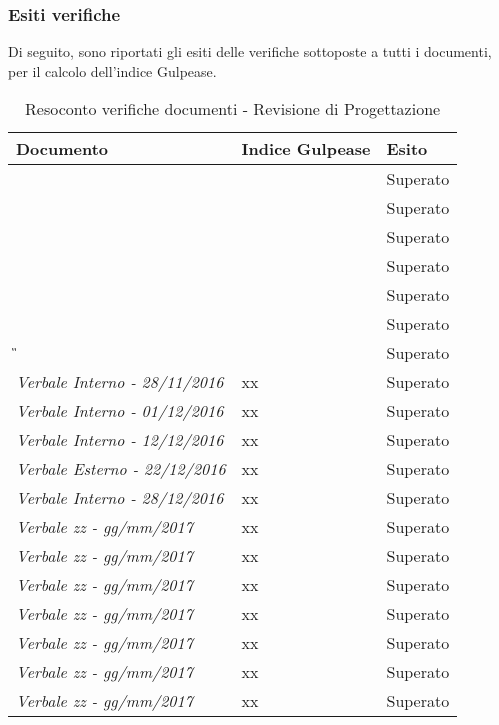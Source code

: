 	\subsubsection{Esiti verifiche}
	Di seguito, sono riportati gli esiti delle verifiche sottoposte a tutti i documenti, per il calcolo dell’indice Gulpease.


	\begin{table}[H]
		\begin{longtable}{>{\centering\arraybackslash}p{5cm}|>{\centering\arraybackslash}p{5cm} | >{\centering\arraybackslash}p{5cm}}
			\hline
			\rowcolor{Gray}
			\textbf{Documento} & \textbf{Indice Gulpease} & \textbf{Esito} \\
			\hline
			\textit{\ST} &  & Superato\\
			\hline
			\textit{\NdP} &  & Superato\\
			\hline
			\textit{\PdP} &  & Superato \\
			\hline
			\textit{\PdQ} &  & Superato\\
			\hline
			\textit{\AdR} &  & Superato \\
			\hline
			\textit{\SdF} &  & Superato\\
			\hline
			\textit{\G}&  & Superato\\
			\hline
			\textit{Verbale Interno - 28/11/2016}		& 	xx	&	Superato	\\
			\hline
			\textit{Verbale Interno - 01/12/2016}		& 	xx	&	Superato	\\
			\hline
			\textit{Verbale Interno - 12/12/2016}		& 	xx	&	Superato	\\
			\hline
			\textit{Verbale Esterno - 22/12/2016}		& 	xx	&	Superato	\\
			\hline
			\textit{Verbale Interno - 28/12/2016}		& 	xx	&	Superato	\\
			\hline
			\textit{Verbale zz - gg/mm/2017}		& 	xx	&	Superato	\\
			\hline
			\textit{Verbale zz - gg/mm/2017}		& 	xx	&	Superato	\\
			\hline
			\textit{Verbale zz - gg/mm/2017}		& 	xx	&	Superato	\\
			\hline
			\textit{Verbale zz - gg/mm/2017}		& 	xx	&	Superato	\\
			\hline
			\textit{Verbale zz - gg/mm/2017}		& 	xx	&	Superato	\\
			\hline
			\textit{Verbale zz - gg/mm/2017}		& 	xx	&	Superato	\\
			\hline
			\textit{Verbale zz - gg/mm/2017}		& 	xx	&	Superato	\\
		\end{longtable}
		\caption{Resoconto verifiche documenti - Revisione di Progettazione}
	\end{table}